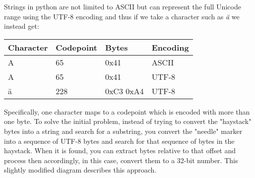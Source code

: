 \documentclass[twocolumn]{article}
\begin{document}
Strings in python are not limited to ASCII but can represent the full Unicode range using the UTF-8 encoding and thus if we take a character such as \textit{ä} we instead get:

\begin{table}[h]
\centering
\begin{tabular}{|l|l|l|l|}
\hline
Character & Codepoint & Bytes     & Encoding \\ \hline
A         & 65        & 0x41      & ASCII    \\ \hline
A         & 65        & 0x41      & UTF-8    \\ \hline
ä         & 228       & 0xC3 0xA4 & UTF-8    \\ \hline
\end{tabular}
\end{table}

Specifically, one character maps to a codepoint which is encoded with more than one byte. To solve the initial problem, instead of trying to convert the "haystack" bytes into a string and search for a substring, you convert the "needle" marker into a sequence of UTF-8 bytes and search for that sequence of bytes in the haystack. When it is found, you can extract bytes relative to that offset and process then accordingly, in this case, convert them to a 32-bit number. This slightly modified diagram describes this approach.

\end{document}
